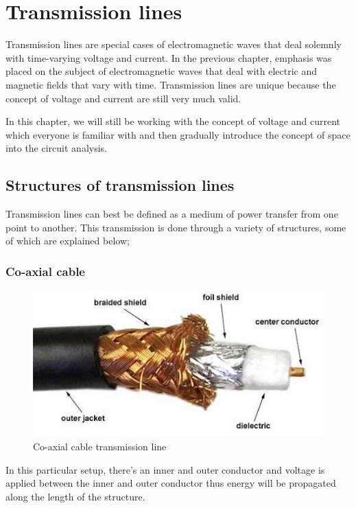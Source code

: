 \chapter{Transmission lines}
Transmission lines are special cases of electromagnetic waves that deal solemnly with time-varying voltage and current. In the previous chapter, emphasis was placed on the subject of electromagnetic waves that deal with electric and magnetic fields that vary with time. Transmission lines are unique because the concept of voltage and current are still very much valid.

In this chapter, we will still be working with the concept of voltage and current which everyone is familiar with and then gradually introduce the concept of space into the circuit analysis. 

\section{Structures of transmission lines}
Transmission lines can best be defined as a medium of power transfer from one point to another. This transmission is done through a variety of structures, some of which are explained below;

\subsection{Co-axial cable}	
\begin{figure}[h]
\centering
\includegraphics[scale=0.65]{./graphics/coaxial}
\caption{Co-axial cable transmission line}
\end{figure}
 In this particular setup, there’s an inner and outer conductor and voltage is applied between the inner and outer conductor thus energy will be propagated along the length of the structure.

